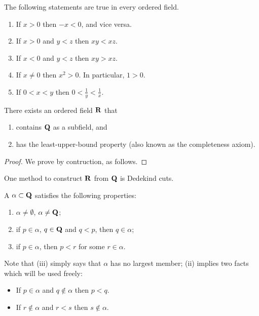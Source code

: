 \begin{proposition}
The following statements are true in every ordered field.
\begin{enumerate}[label=(\roman*)]
\item If $x>0$ then $-x<0$, and vice versa.
\item If $x>0$ and $y<z$ then $xy<xz$.
\item If $x<0$ and $y<z$ then $xy>xz$.
\item If $x\neq0$ then $x^2>0$. In particular, $1>0$.
\item If $0<x<y$ then $0<\frac{1}{y}<\frac{1}{x}$.
\end{enumerate}
\end{proposition}

\begin{theorem}
There exists an ordered field $\mathbf R$ that
\begin{enumerate}[label=(\roman*)]
\item contains $\mathbf Q$ as a subfield, and
\item has the least-upper-bound property (also known as the completeness axiom).
\end{enumerate}
\end{theorem}

\begin{proof}
We prove by contruction, as follows. 
\end{proof}

One method to construct $\mathbf R$ from $\mathbf Q$ is Dedekind cuts.

\begin{definition*}
A  $\alpha\subset\mathbf Q$ satisfies the following properties:
\begin{enumerate}[label=(\roman*)]
\item $\alpha\neq\emptyset$, $\alpha\neq\mathbf Q$;
\item if $p\in\alpha$, $q\in\mathbf Q$ and $q<p$, then $q\in\alpha$;
\item if $p\in\alpha$, then $p<r$ for some $r\in\alpha$.
\end{enumerate}
\end{definition*}

Note that (iii) simply says that $\alpha$ has no largest member; (ii) implies two facts which will be used freely:
\begin{itemize}
\item If $p\in\alpha$ and $q\notin\alpha$ then $p<q$.
\item If $r\notin\alpha$ and $r<s$ then $s\notin\alpha$.
\end{itemize}

